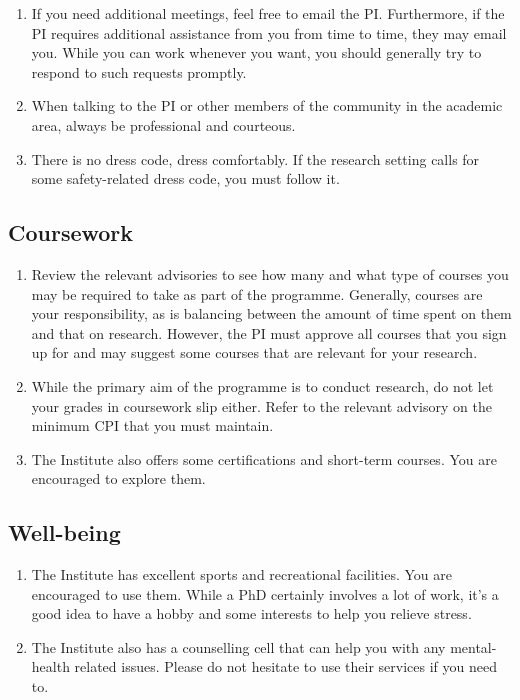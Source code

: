 \documentclass[12pt]{article}
\begin{document}
\begin{enumerate}
	\item If you need additional meetings, feel free to email the PI. Furthermore, if the PI requires additional assistance from you from time to time, they may email you. While you can work whenever you want, you should generally try to respond to such requests promptly. 
	\item When talking to the PI or other members of the community in the academic area, always be professional and courteous. 
	\item There is no dress code, dress comfortably. If the research setting calls for some safety-related dress code, you must follow it.
\end{enumerate}

\subsection{Coursework}
\begin{enumerate}
	\item Review the relevant advisories to see how many and what type of courses you may be required to take as part of the programme. Generally, courses are your responsibility, as is balancing between the amount of time spent on them and that on research. However, the PI must approve all courses that you sign up for and may suggest some courses that are relevant for your research.
	\item While the primary aim of the programme is to conduct research, do not let your grades in coursework slip either. Refer to the relevant advisory on the minimum CPI that you must maintain.
	\item The Institute also offers some certifications and short-term courses. You are encouraged to explore them.  
\end{enumerate}

\subsection{Well-being}
\begin{enumerate}
	\item The Institute has excellent sports and recreational facilities. You are encouraged to use them. While a PhD certainly involves a lot of work, it's a good idea to have a hobby and some interests to help you relieve stress.
	\item The Institute also has a counselling cell that can help you with any mental-health related issues. Please do not hesitate to use their services if you need to.
\end{enumerate}
\end{document}
